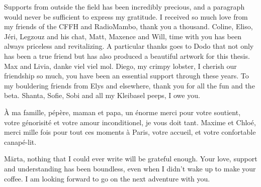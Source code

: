 \medbreak

Supports from outside the field has been incredibly precious, and a paragraph would never be sufficient to express my gratitude.
I received so much love from my friends of the CFFH and RadioMambo, thank you a thousand.
Coline, Eliso, Jéri, Legzouz and his chat, Matt, Maxence and Will, time with you has been always priceless and revitalizing.
A particular thanks goes to Dodo that not only has been a true friend but has also produced a beautiful artwork for this thesis.
Max and Livia, danke viel viel mol. 
Diego, my crimpy lobster, I cherish our friendship so much, you have been an essential support through these years.
To my bouldering friends from Elys and elsewhere, thank you for all the fun and the beta.
Shanta, Sofie, Sobi and all my Kleibasel peeps, I owe you.

\medbreak


À ma famille, pépère, maman et papa, un énorme merci pour votre soutient, votre génorisité et votre amour inconditionel, je vous doit tant.
Maxime et Chloé, merci mille fois pour tout ces moments à Paris, votre accueil, et votre confortable canapé-lit.

\medbreak

Märta, nothing that I could ever write will be grateful enough.
Your love, support and understanding has been boundless, even when I didn't wake up to make your coffee.
I am looking forward to go on the next adventure with you.

